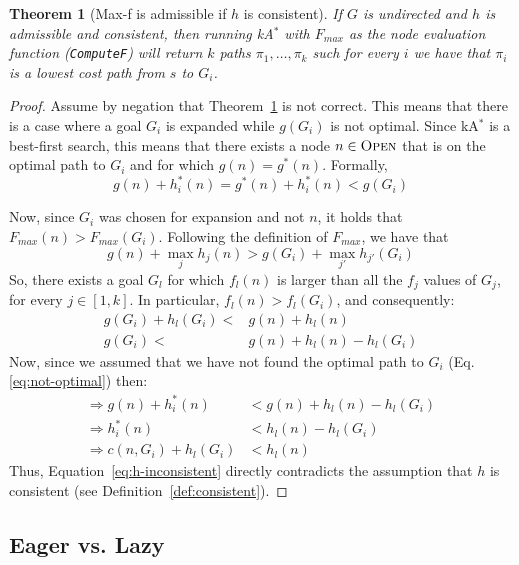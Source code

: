 \documentclass{aicom2e}
\newtheorem{theorem}{Theorem}
\newcommand{\kastar}{kA$^*$}
\newcommand{\maxf}{Max-f}
\newcommand{\open}{\textsc{Open}}
\begin{document}
 
\begin{theorem}[\maxf{} is admissible if $h$ is consistent]
If $G$ is undirected and $h$ is admissible and consistent, 
then running \kastar{} with $F_{max}$ 
as the node evaluation function ({\tt ComputeF}) 
will return $k$ paths $\pi_1,\ldots, \pi_k$ such for every $i$ we have that $\pi_i$ is a lowest cost path from $s$ to $G_i$. 
\label{the:max-f}
\end{theorem}
 \begin{proof}
 Assume by negation that Theorem~\ref{the:max-f} is not correct. This means
 that there is a case where a goal $G_i$ is expanded while $g(G_i)$ is not optimal. Since \kastar{} is a best-first search, this means that there exists a node $n\in \open{}$ that is on the optimal path to $G_i$ and for which $g(n)=g^*(n)$. Formally, 
 \begin{equation}
     g(n)+h_i^*(n) = g^*(n)+h_i^*(n) < g(G_i)
    \label{eq:not-optimal}
 \end{equation}
 
 Now, since $G_i$ was chosen for expansion and not $n$, it holds that $F_{max}(n)  > F_{max}(G_i)$. Following the definition of $F_{max}$, we have that
 \begin{equation}
     g(n)+\max_j h_j(n) > g(G_i) + \max_{j'} h_{j'}(G_i)
 \end{equation}
 So, there exists a goal $G_l$ for which $f_l(n)$ is larger than 
 all the $f_j$ values of $G_j$, for every $j\in [1,k]$. In particular, 
 $f_l(n)>f_l(G_i)$, and consequently:
 \begin{align}
     g(G_i)+h_l(G_i) < & g(n)+h_l(n) \\
     g(G_i) < & g(n)+h_l(n) - h_l(G_i) 
 \end{align} 
Now, since we assumed that we have not found the optimal path to $G_i$ (Eq.~ \ref{eq:not-optimal}) then:
\begin{align}
\Rightarrow g(n)+h^*_i(n)  & < g(n)+h_l(n) - h_l(G_i)\\
\Rightarrow h^*_i(n)  & < h_l(n) - h_l(G_i)\\
\Rightarrow c(n,G_i) + h_l(G_i) & < h_l(n) \label{eq:h-inconsistent} 
\end{align}
Thus, Equation~\ref{eq:h-inconsistent} directly contradicts the assumption
that $h$ is consistent (see Definition~\ref{def:consistent}). 
\end{proof} 




\subsection{Eager vs. Lazy}
\end{document}
